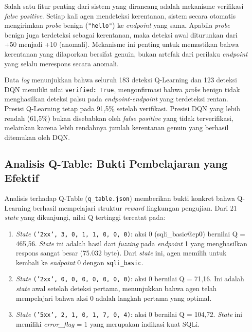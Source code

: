 Salah satu fitur penting dari sistem yang dirancang adalah mekanisme verifikasi \textit{false positive}. Setiap kali agen mendeteksi kerentanan, sistem secara otomatis mengirimkan \textit{probe} benign (\texttt{"hello"}) ke \textit{endpoint} yang sama. Apabila \textit{probe} benign juga terdeteksi sebagai kerentanan, maka deteksi awal diturunkan dari +50 menjadi +10 (anomali). Mekanisme ini penting untuk memastikan bahwa kerentanan yang dilaporkan bersifat genuin, bukan artefak dari perilaku \textit{endpoint} yang selalu merespons secara anomali.

Data \textit{log} menunjukkan bahwa seluruh 183 deteksi Q-Learning dan 123 deteksi DQN memiliki nilai \texttt{verified: True}, mengonfirmasi bahwa \textit{probe} benign tidak menghasilkan deteksi palsu pada \textit{endpoint-endpoint} yang terdeteksi rentan. Presisi Q-Learning tetap pada 91,5\% setelah verifikasi. Presisi DQN yang lebih rendah (61,5\%) bukan disebabkan oleh \textit{false positive} yang tidak terverifikasi, melainkan karena lebih rendahnya jumlah kerentanan genuin yang berhasil ditemukan oleh DQN.

\subsection{Analisis Q-Table: Bukti Pembelajaran yang Efektif}

Analisis terhadap Q-Table (\texttt{q\_table.json}) memberikan bukti konkret bahwa Q-Learning berhasil mempelajari struktur \textit{reward} lingkungan pengujian. Dari 21 \textit{state} yang dikunjungi, nilai Q tertinggi tercatat pada:

\begin{enumerate}
    \item \textit{State} \texttt{('2xx', 3, 0, 1, 1, 0, 0, 0)}: aksi 0 (sqli\_basic@ep0) bernilai Q = 465,56. \textit{State} ini adalah hasil dari \textit{fuzzing} pada \textit{endpoint} 1 yang menghasilkan respons sangat besar (75.032 byte). Dari \textit{state} ini, agen memilih untuk kembali ke \textit{endpoint} 0 dengan \texttt{sqli\_basic}.
    \item \textit{State} \texttt{('2xx', 0, 0, 0, 0, 0, 0, 0)}: aksi 0 bernilai Q = 71,16. Ini adalah \textit{state} awal setelah deteksi pertama, menunjukkan bahwa agen telah mempelajari bahwa aksi 0 adalah langkah pertama yang optimal.
    \item \textit{State} \texttt{('5xx', 2, 1, 0, 1, 7, 0, 4)}: aksi 0 bernilai Q = 104,72. \textit{State} ini memiliki \textit{error\_flag} = 1 yang merupakan indikasi kuat SQLi.
\end{enumerate}

